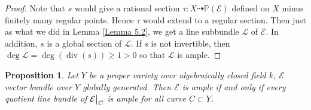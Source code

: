\documentclass{ctexart}
\newtheorem{proposition}{Proposition}[section]
\newcommand{\divisor}{\operatorname{div}}
\begin{document}
\begin{proof}
    Note that $s$ would give a rational section $\tau: X \dashrightarrow \mathbb{P}(\mathcal{E})$ defined on $X$ minus finitely many regular points.
    Hence $\tau$ would extend to a regular section.
    Then just as what we did in Lemma \ref{Lemma 5.2}, we get a line subbundle $\mathcal{L}$ of $\mathcal{E}$.
    In addition, $s$ is a global section of $\mathcal{L}$.
    If $s$ is not invertible, then $\deg \mathcal{L} = \deg (\divisor (s)) \ge 1 > 0$ so that $\mathcal{L}$ is ample.
\end{proof}
\begin{proposition}
    Let $Y$ be a proper variety over algebraically closed field $k$, $\mathcal{E}$ vector bundle over $Y$ globally generated.
    Then $\mathcal{E}$ is ample if and only if every quotient line bundle of $\mathcal{E}\big{|}_{C}$ is ample for all curve $C \subset Y$.
    \label{Proposition 6.10}
\end{proposition}
\end{document}
